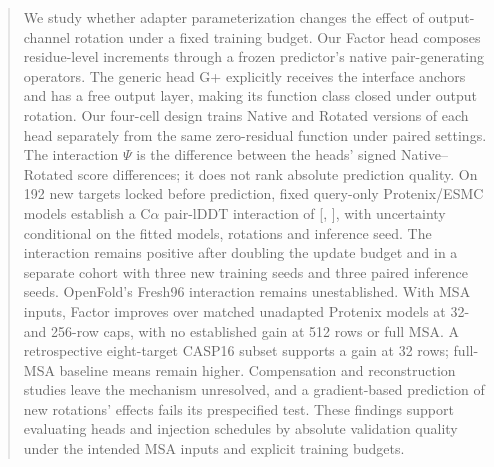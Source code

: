 \begin{abstract}
We study whether adapter parameterization changes the effect of output-channel
rotation under a fixed training budget. Our Factor head composes residue-level
increments through a frozen predictor's native pair-generating operators.
The generic head G+ explicitly receives the interface anchors and has a free
output layer, making its function class closed under output rotation.
Our four-cell design trains Native and Rotated versions of each head separately
from the same zero-residual function under paired settings. The interaction
$\Psi$ is the difference between the heads' signed Native--Rotated score
differences; it does not rank absolute prediction quality.
On 192 new targets locked before prediction, fixed query-only Protenix/ESMC models
establish a C$\alpha$ pair-lDDT interaction of 
[, ],
with uncertainty conditional on the fitted models, rotations and inference
seed. The interaction remains positive after doubling the update budget
and in a separate cohort with three new training seeds and three paired
inference seeds. OpenFold's Fresh96 interaction remains unestablished.
With MSA inputs, Factor improves over matched unadapted Protenix models
at 32- and 256-row caps, with no established gain at 512 rows or full MSA.
A retrospective eight-target CASP16 subset supports a gain at 32 rows;
full-MSA baseline means remain higher. Compensation and reconstruction
studies leave the mechanism unresolved, and a gradient-based prediction of
new rotations' effects fails its prespecified test. These findings support evaluating
heads and injection schedules by absolute validation quality under the
intended MSA inputs and explicit training budgets.
\end{abstract}
